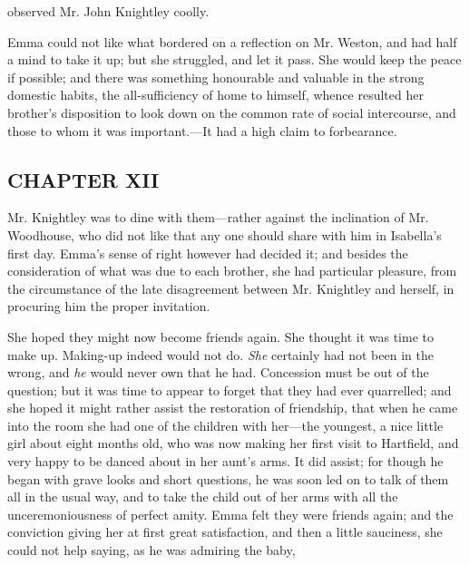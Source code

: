  observed Mr. John Knightley coolly. 

Emma could not like what bordered on a reflection on Mr. Weston, and had half a mind to take it up; but she struggled, and let it pass. She would keep the peace if possible; and there was something honourable and valuable in the strong domestic habits, the all-sufficiency of home to himself, whence resulted her brother's disposition to look down on the common rate of social intercourse, and those to whom it was important.---It had a high claim to forbearance.

\subsection[chapter-xii]{\useURL[url12][][][]\from[url12]CHAPTER XII}

Mr. Knightley was to dine with them---rather against the inclination of Mr. Woodhouse, who did not like that any one should share with him in Isabella's first day. Emma's sense of right however had decided it; and besides the consideration of what was due to each brother, she had particular pleasure, from the circumstance of the late disagreement between Mr. Knightley and herself, in procuring him the proper invitation.

She hoped they might now become friends again. She thought it was time to make up. Making-up indeed would not do. {\em She} certainly had not been in the wrong, and {\em he} would never own that he had. Concession must be out of the question; but it was time to appear to forget that they had ever quarrelled; and she hoped it might rather assist the restoration of friendship, that when he came into the room she had one of the children with her---the youngest, a nice little girl about eight months old, who was now making her first visit to Hartfield, and very happy to be danced about in her aunt's arms. It did assist; for though he began with grave looks and short questions, he was soon led on to talk of them all in the usual way, and to take the child out of her arms with all the unceremoniousness of perfect amity. Emma felt they were friends again; and the conviction giving her at first great satisfaction, and then a little sauciness, she could not help saying, as he was admiring the baby,

